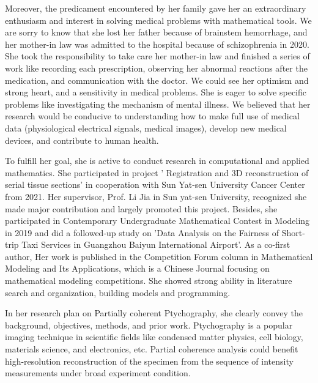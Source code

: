 \documentclass{article}
\numberwithin{equation}{section}
\begin{document}
Moreover, the predicament encountered by her family gave her an extraordinary enthusiasm and interest in solving medical problems with mathematical tools. We are sorry to know that she lost her father because of brainstem hemorrhage, and her mother-in law was admitted to the hospital because of schizophrenia in 2020. She took the responsibility to take care her mother-in law and finished a series of work like recording each prescription, observing her abnormal reactions after the medication, and communication with
the doctor. We could see her optimism and strong heart, and a sensitivity in medical problems. She is eager to solve specific problems like investigating the mechanism of mental illness. We believed that her research would be conducive to understanding how to make full
use of medical data (physiological electrical signals, medical images), develop new medical devices, and
contribute to human health.

To fulfill her goal, she is active to conduct research in computational and applied mathematics. She participated in project ' Registration and 3D reconstruction of serial tissue sections' in cooperation with Sun Yat-sen University Cancer Center from 2021. Her supervisor, Prof. Li Jia in Sun yat-sen University, recognized she made major contribution and largely promoted this project. Besides, she participated in Contemporary Undergraduate Mathematical Contest in Modeling in 2019 and did a followed-up study on 'Data Analysis on the Fairness of Short-trip Taxi Services in Guangzhou Baiyun International Airport'. As a co-first author, Her work is published in the Competition Forum column in Mathematical Modeling and Its Applications, which is a Chinese Journal focusing on mathematical modeling competitions. She showed strong ability in literature search and organization, building models and programming.

In her research plan on Partially coherent Ptychography, she clearly convey the background, objectives, methods, and prior work. Ptychography is a popular imaging technique in scientific fields like condensed matter physics, cell biology,
materials science, and electronics, etc. Partial coherence analysis could benefit high-resolution reconstruction of the specimen
from the sequence of intensity measurements under broad experiment condition.




 
\end{document}
